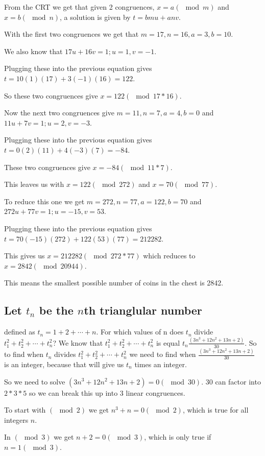 \documentclass[12pt]{article}
\begin{document}
From the CRT we get that given 2 congruences, $x = a (\mod m)$ and $x = b (\mod n)$, a solution is given by $t = bmu + anv$.

With the first two congruences we get that $m = 17, n = 16, a = 3, b = 10$.

We also know that $17u + 16v = 1; u = 1, v = -1$.

Plugging these into the previous equation gives $t = 10(1)(17) + 3(-1)(16) = 122$.

So these two congruences give $x = 122 (\mod 17*16)$.

Now the next two congruences give $m = 11, n = 7, a = 4, b = 0$ and $11u + 7v = 1; u = 2, v = -3$.

Plugging these into the previous equation gives $t = 0(2)(11) + 4(-3)(7) = -84$.

These two congruences give $x = -84 (\mod 11*7)$.

This leaves us with $x = 122 (\mod 272)$ and $x = 70 (\mod 77)$.

To reduce this one we get $m = 272, n = 77, a = 122, b = 70$ and $272u + 77v = 1; u = -15, v = 53$.

Plugging these into the previous equation gives $t = 70(-15)(272) + 122(53)(77) = 212282$.

This gives us $x = 212282 (\mod 272*77)$ which reduces to $x = 2842 (\mod 20944)$.

This means the smallest possible number of coins in the chest is 2842.


\subsection*{Let $t_n$ be the $n$th trianglular number}
defined as $t_n = 1 + 2 + \cdots + n$. For which values of n does $t_n$ divide $t^2_1 + t^2_2 + \cdots + t^2_n$?
We know that $t^2_1 + t^2_2 + \cdots + t^2_n$ is equal $t_n\frac{(3n^3+12n^2+13n+2)}{30}$.
So to find when $t_n$ divides $t^2_1 + t^2_2 + \cdots + t^2_n$ we need to find when $\frac{(3n^3+12n^2+13n+2)}{30}$
is an integer, because that will give us $t_n$ times an integer.

So we need to solve $(3n^3+12n^2+13n+2) = 0 (\mod 30)$. $30$ can factor into $2*3*5$ so we can break this up into 3 linear congruences.

To start with $(\mod 2)$ we get $n^3 + n = 0 (\mod 2)$, which is true for all integers $n$.

In $(\mod 3)$ we get $n + 2 = 0 (\mod 3)$, which is only true if $n = 1 (\mod 3)$.
\end{document}
